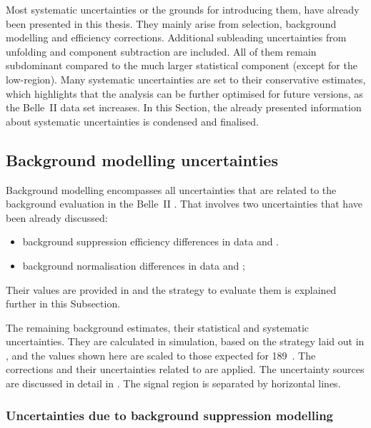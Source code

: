 Most systematic uncertainties or the grounds for introducing them, have already been presented in this thesis.
They mainly arise from selection, background modelling and efficiency corrections.
Additional subleading uncertainties from unfolding and \BtoXdgamma component subtraction are included.
All of them remain subdominant compared to the much larger statistical component (except for the low-\EB region).
Many systematic uncertainties are set to their conservative estimates, 
which highlights that the analysis can be further optimised for future versions, as the Belle~II data set increases.
In this Section, the already presented information about systematic uncertainties is condensed and finalised.

\subsection{Background modelling uncertainties}\label{sec:background_uncertainties}

Background modelling encompasses all uncertainties that are related to the background evaluation in the Belle~II \MC.
That involves two uncertainties that have been already discussed:
\begin{itemize}
    \item background suppression efficiency differences in data and \MC.
    \item background normalisation differences in data and \MC;
\end{itemize}
Their values are provided in  and the strategy to evaluate them is explained further in this Subsection.

\begin{table}[htbp!]
    \centering
    \caption{\label{tab:background_uncertainties} 
    The remaining \BB background estimates, their statistical and systematic uncertainties.
    They are calculated in simulation, based on the strategy laid out in , 
    and the values shown here are scaled to those expected for 189~\invfb.
    The corrections and their uncertainties related to  are applied.
    The uncertainty sources are discussed in detail in .
    The signal region is separated by horizontal lines.
    }
    
\end{table}

\subsubsection{Uncertainties due to background suppression modelling}\label{sec:correction_systematic}

